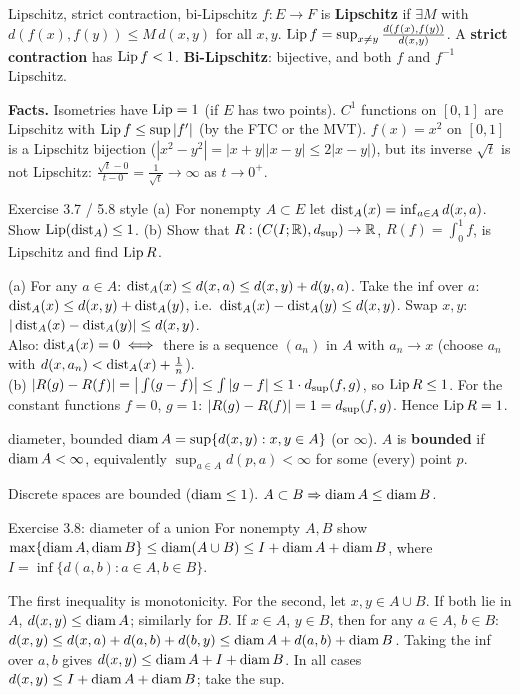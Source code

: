 \begin{defn}{Lipschitz, strict contraction, bi-Lipschitz}
$f:E\to F$ is \textbf{Lipschitz} if $\exists M$ with $d(f(x),f(y))\le M\,d(x,y)$ for all $x,y$.
$\operatorname{Lip} f=\sup_{x\ne y}\frac{d(f(x),f(y))}{d(x,y)}$. A \textbf{strict contraction} has
$\operatorname{Lip} f<1$. \textbf{Bi-Lipschitz}: bijective, and both $f$ and $f^{-1}$ Lipschitz.
\end{defn}
\textbf{Facts.} Isometries have $\operatorname{Lip}=1$ (if $E$ has two points). $C^1$ functions on $[0,1]$ are
Lipschitz with $\operatorname{Lip} f\le\sup|f'|$ (by the FTC or the MVT). $f(x)=x^2$ on $[0,1]$ is a
Lipschitz bijection ($|x^2-y^2|=|x+y||x-y|\le2|x-y|$), but its inverse $\sqrt t$ is not
Lipschitz: $\frac{\sqrt t-0}{t-0}=\frac1{\sqrt t}\to\infty$ as $t\to 0^+$.

\begin{exam}{Exercise 3.7 / 5.8 style}
(a) For nonempty $A\subset E$ let $\operatorname{dist}_A(x)=\inf_{a\in A}d(x,a)$. Show $\operatorname{Lip}(\operatorname{dist}_A)\le1$.
(b) Show that $R:(C(I;\mathbb R),d_{\sup})\to\mathbb R$, $R(f)=\int_0^1 f$, is Lipschitz and find $\operatorname{Lip} R$.
\end{exam}
\begin{answer}
(a) For any $a\in A$: $\operatorname{dist}_A(x)\le d(x,a)\le d(x,y)+d(y,a)$. Take the inf over $a$:
$\operatorname{dist}_A(x)\le d(x,y)+\operatorname{dist}_A(y)$, i.e.\ $\operatorname{dist}_A(x)-\operatorname{dist}_A(y)\le d(x,y)$. Swap $x,y$:
$|\operatorname{dist}_A(x)-\operatorname{dist}_A(y)|\le d(x,y)$.\\
Also: $\operatorname{dist}_A(x)=0\iff$ there is a sequence $(a_n)$ in $A$ with $a_n\to x$ (choose
$a_n$ with $d(x,a_n)<\operatorname{dist}_A(x)+\frac1n$).\\
(b) $|R(g)-R(f)|=\big|\int(g-f)\big|\le\int|g-f|\le1\cdot d_{\sup}(f,g)$, so $\operatorname{Lip} R\le1$. For the
constant functions $f=0$, $g=1$: $|R(g)-R(f)|=1=d_{\sup}(f,g)$. Hence $\operatorname{Lip} R=1$.
\end{answer}

\begin{defn}{diameter, bounded}
$\operatorname{diam} A=\sup\{d(x,y):x,y\in A\}$ (or $\infty$). $A$ is \textbf{bounded} if $\operatorname{diam} A<\infty$,
equivalently $\sup_{a\in A}d(p,a)<\infty$ for some (every) point $p$.
\end{defn}
Discrete spaces are bounded ($\operatorname{diam}\le1$). $A\subset B\Rightarrow\operatorname{diam} A\le\operatorname{diam} B$.

\begin{exam}{Exercise 3.8: diameter of a union}
For nonempty $A,B$ show $\max\{\operatorname{diam} A,\operatorname{diam} B\}\le\operatorname{diam}(A\cup B)\le I+\operatorname{diam} A+\operatorname{diam} B$, where
$I=\inf\{d(a,b):a\in A,b\in B\}$.
\end{exam}
\begin{answer}
The first inequality is monotonicity. For the second, let $x,y\in A\cup B$. If both lie in $A$,
$d(x,y)\le\operatorname{diam} A$; similarly for $B$. If $x\in A$, $y\in B$, then for any $a\in A$, $b\in B$:
$d(x,y)\le d(x,a)+d(a,b)+d(b,y)\le\operatorname{diam} A+d(a,b)+\operatorname{diam} B$. Taking the inf over $a,b$ gives
$d(x,y)\le\operatorname{diam} A+I+\operatorname{diam} B$. In all cases $d(x,y)\le I+\operatorname{diam} A+\operatorname{diam} B$; take the sup.
\end{answer}

